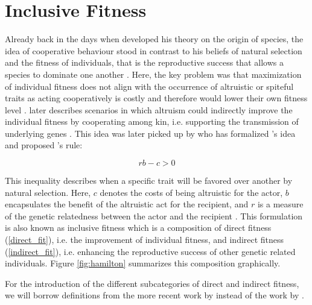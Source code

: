 \documentclass[sigconf]{acmart}
\newcommand{\todo}[1]{{\color{red}{#1}}}
\begin{document}
    \todo{maybe extend introduction a little bit more, maybe also some concrete examples from nature}


    \section{Inclusive Fitness}

    Already back in the days when \citeauthor{darwin_origin_1859} developed his theory on the origin of species, the idea of cooperative behaviour stood in contrast to his beliefs of natural selection and the fitness of individuals, that is the reproductive success that allows a species to dominate one another \cite{pennisi_how_2005}.
    Here, the key problem was that maximization of individual fitness does not align with the occurrence of altruistic or spiteful traits as acting cooperatively is costly and therefore would lower their own fitness level \cite{west_altruism_2010}.
    \citeauthor{darwin_origin_1859} later describes scenarios in which altruism could indirectly improve the individual fitness by cooperating among kin, i.e. supporting the transmission of underlying genes \cite{pennisi_how_2005,gardner_theory_2009}.
    This idea was later picked up by \citeauthor{hamilton_kin_1964} who has formalized \citeauthor{darwin_origin_1859}'s idea and proposed \citeauthor{hamilton_kin_1964}'s rule:

    $$rb-c>0$$

    This inequality describes when a specific trait will be favored over another by natural selection.
    Here, $c$ denotes the costs of being altruistic for the actor, $b$ encapsulates the benefit of the altruistic act for the recipient, and $r$ is a measure of the genetic relatedness between the actor and the recipient \cite{west_altruism_2010}.
    This formulation is also known as inclusive fitness which is a composition of direct fitness (\ref{direct_fit}), i.e. the improvement of individual fitness, and indirect fitness (\ref{indirect_fit}), i.e. enhancing the reproductive success of other genetic related individuals.
    Figure \ref{fig:hamilton} summarizes this composition graphically.

    For the introduction of the different subcategories of direct and indirect fitness, we will borrow definitions from the more recent work by \citeauthor{west_altruism_2010} \cite{west_altruism_2010} instead of the work by \citeauthor{gardner_theory_2009} \cite{gardner_theory_2009}.
\end{document}
